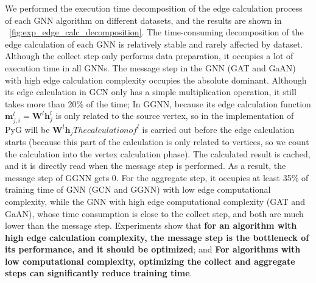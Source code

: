 We performed the execution time decomposition of the edge calculation process of each GNN algorithm on different datasets,
and the results are shown in \figurename~\ref{fig:exp_edge_calc_decomposition}.
The time-consuming decomposition of the edge calculation of each GNN is relatively stable and rarely affected by dataset.
Although the collect step only performs data preparation, it occupies a lot of execution time in all GNNs.
The message step in the GNN (GAT and GaAN) with high edge calculation complexity occupies the absolute dominant.
Although its edge calculation in GCN only has a simple multiplication operation, it still takes more than 20\% of the time; 
In GGNN, because its edge calculation function $\boldsymbol{m}_{j,i }^l=\boldsymbol{W}^l\boldsymbol{h}_{j}^l$ is only related to the source vertex, 
so in the implementation of PyG will be $\boldsymbol{W}^l\boldsymbol{h}_j The calculation of ^l$ is carried out before the edge calculation starts
(because this part of the calculation is only related to vertices, so we count the calculation into the vertex calculation phase).
The calculated result is cached, and it is directly read when the message step is performed. As a result, the message step of GGNN gets 0.
For the aggregate step, it occupies at least 35\% of training time of GNN (GCN and GGNN) with low edge computational complexity,
while the GNN with high edge computational complexity (GAT and GaAN), whose time consumption is close to the collect step,
and both are much lower than the message step. Experiments show that \textbf{for an algorithm with high edge calculation complexity,
the message step is the bottleneck of its performance, and it should be optimized}; and \textbf{For algorithms with low computational complexity,
optimizing the collect and aggregate steps can significantly reduce training time}.

